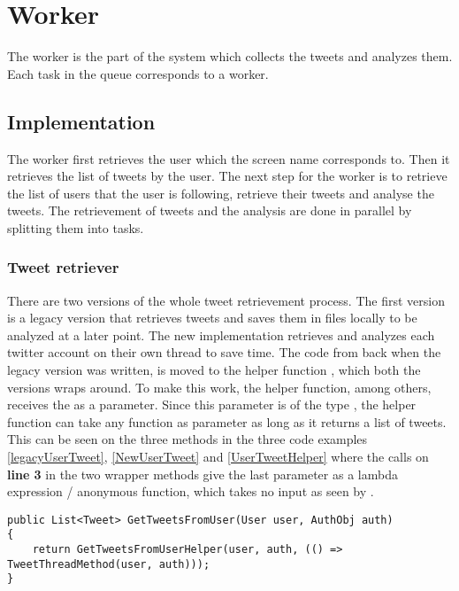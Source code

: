 \chapter{Worker}\label{workerLabel}
The worker is the part of the system which collects the tweets and analyzes
them. Each task in the queue corresponds to a worker. 

\section{Implementation}
The worker first retrieves the user which the screen name corresponds to. Then
it retrieves the list of tweets by the user. The next step for the
worker is to retrieve the list of users that the user is following, retrieve
their tweets and analyse the tweets. The retrievement of tweets and the
analysis are done in parallel by splitting them into tasks.

\subsection{Tweet retriever} \label{sub:tweetretriever}
There are two versions of the whole tweet retrievement process. The first
version is a legacy version that retrieves tweets and saves them in files
locally to be analyzed at a later point. The new implementation retrieves and
analyzes each twitter account on their own thread to save time. The code from
back when the legacy version was written, is moved to the helper function
, which both the versions wraps around. To make this
work, the helper function, among others, receives the  as
a parameter. Since this parameter is of the type , the
helper function can take any function as parameter as long as it returns a list
of tweets.
This can be seen on the three methods in the three code examples
\autoref{legacyUserTweet}, \autoref{NewUserTweet} and
\autoref{UserTweetHelper} where the calls on \textbf{line 3} in the two
wrapper methods give the last parameter as a lambda expression / anonymous
function, which takes no input as seen by \textc{() =>}.\\

\begin{minipage}[H]{\linewidth}
\begin{lstlisting}[caption = Legacy method call , label = legacyUserTweet ] 
public List<Tweet> GetTweetsFromUser(User user, AuthObj auth)
{	
    return GetTweetsFromUserHelper(user, auth, (() => TweetThreadMethod(user, auth)));
}
\end{lstlisting}
\end{minipage}

